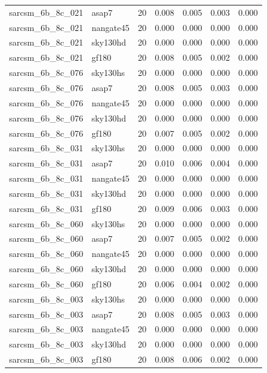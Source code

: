 \begin{tabular}{llrrrrr}
sarcsm\_6b\_8c\_021 & asap7 & 20 & 0.008 & 0.005 & 0.003 & 0.000 \\
sarcsm\_6b\_8c\_021 & nangate45 & 20 & 0.000 & 0.000 & 0.000 & 0.000 \\
sarcsm\_6b\_8c\_021 & sky130hd & 20 & 0.000 & 0.000 & 0.000 & 0.000 \\
sarcsm\_6b\_8c\_021 & gf180 & 20 & 0.008 & 0.005 & 0.002 & 0.000 \\
sarcsm\_6b\_8c\_076 & sky130hs & 20 & 0.000 & 0.000 & 0.000 & 0.000 \\
sarcsm\_6b\_8c\_076 & asap7 & 20 & 0.008 & 0.005 & 0.003 & 0.000 \\
sarcsm\_6b\_8c\_076 & nangate45 & 20 & 0.000 & 0.000 & 0.000 & 0.000 \\
sarcsm\_6b\_8c\_076 & sky130hd & 20 & 0.000 & 0.000 & 0.000 & 0.000 \\
sarcsm\_6b\_8c\_076 & gf180 & 20 & 0.007 & 0.005 & 0.002 & 0.000 \\
sarcsm\_6b\_8c\_031 & sky130hs & 20 & 0.000 & 0.000 & 0.000 & 0.000 \\
sarcsm\_6b\_8c\_031 & asap7 & 20 & 0.010 & 0.006 & 0.004 & 0.000 \\
sarcsm\_6b\_8c\_031 & nangate45 & 20 & 0.000 & 0.000 & 0.000 & 0.000 \\
sarcsm\_6b\_8c\_031 & sky130hd & 20 & 0.000 & 0.000 & 0.000 & 0.000 \\
sarcsm\_6b\_8c\_031 & gf180 & 20 & 0.009 & 0.006 & 0.003 & 0.000 \\
sarcsm\_6b\_8c\_060 & sky130hs & 20 & 0.000 & 0.000 & 0.000 & 0.000 \\
sarcsm\_6b\_8c\_060 & asap7 & 20 & 0.007 & 0.005 & 0.002 & 0.000 \\
sarcsm\_6b\_8c\_060 & nangate45 & 20 & 0.000 & 0.000 & 0.000 & 0.000 \\
sarcsm\_6b\_8c\_060 & sky130hd & 20 & 0.000 & 0.000 & 0.000 & 0.000 \\
sarcsm\_6b\_8c\_060 & gf180 & 20 & 0.006 & 0.004 & 0.002 & 0.000 \\
sarcsm\_6b\_8c\_003 & sky130hs & 20 & 0.000 & 0.000 & 0.000 & 0.000 \\
sarcsm\_6b\_8c\_003 & asap7 & 20 & 0.008 & 0.005 & 0.003 & 0.000 \\
sarcsm\_6b\_8c\_003 & nangate45 & 20 & 0.000 & 0.000 & 0.000 & 0.000 \\
sarcsm\_6b\_8c\_003 & sky130hd & 20 & 0.000 & 0.000 & 0.000 & 0.000 \\
sarcsm\_6b\_8c\_003 & gf180 & 20 & 0.008 & 0.006 & 0.002 & 0.000 \\

\end{tabular}
